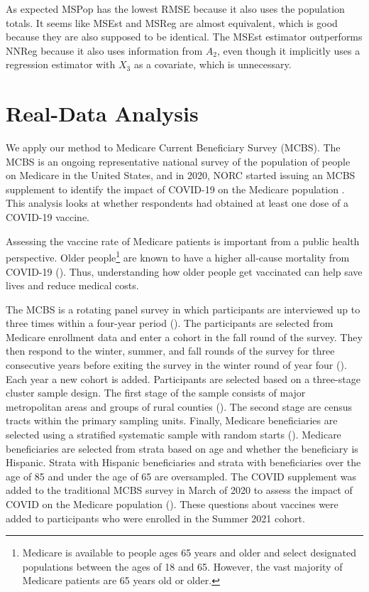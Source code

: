 \documentclass[12pt]{article}
\begin{document}
As expected MSPop has the lowest RMSE because it also uses the population
totals. It seems like MSEst and MSReg are almost equivalent, which is good
because they are also supposed to be identical. The MSEst estimator outperforms
NNReg because it also uses information from $A_2$, even though it implicitly
uses a regression estimator with $X_3$ as a covariate, which is unnecessary.
\section{Real-Data Analysis}

We apply our method to Medicare Current Beneficiary Survey (MCBS). The MCBS
is an ongoing representative national survey of the population of people on
Medicare in the United States, and in 2020, NORC started issuing an MCBS
supplement to identify the impact of COVID-19 on the Medicare population
\cite{norc2020mcbs}. This analysis looks at whether
respondents had obtained at least one dose of a COVID-19 vaccine.

Assessing the vaccine rate of Medicare patients is important from a public
health perspective. Older people\footnote{Medicare is available to people ages
65 years and older and select designated populations between the ages of 18 and
65. However, the vast majority of Medicare patients are 65 years old or older.}
are known to have a higher all-cause mortality from
COVID-19 (\cite{bonanad2020effect}). Thus, understanding how older people get
vaccinated can help save lives and reduce medical costs.

The MCBS is a rotating panel survey in which participants are interviewed up to
three times within a four-year period (\cite{cms2021mcbs}). The participants
are selected from Medicare enrollment data and enter a cohort in the fall round
of the survey. They then respond to the winter, summer,
and fall rounds of the survey for three consecutive years before exiting the
survey in the winter round of year four (\cite{cms2021mcbs}). Each year a new
cohort is added. Participants are selected based on a three-stage cluster sample
design. The first stage of the sample consists of major metropolitan areas and
groups of rural counties (\cite{cms2021mcbs}). The second stage are census
tracts within the primary sampling units. Finally, Medicare beneficiaries are
selected using a stratified systematic sample with random starts 
(\cite{cms2021mcbs}). Medicare beneficiaries are selected from strata based on
age and whether the beneficiary is Hispanic. Strata with Hispanic beneficiaries
and strata with beneficiaries over the age of 85 and under the age of 65 are
oversampled.
The COVID supplement was added to the traditional MCBS survey in March of
2020 to assess the impact of COVID on the Medicare
population (\cite{cms2021covid}). These questions about vaccines were added to
participants who were enrolled in the Summer 2021 cohort.
\end{document}
